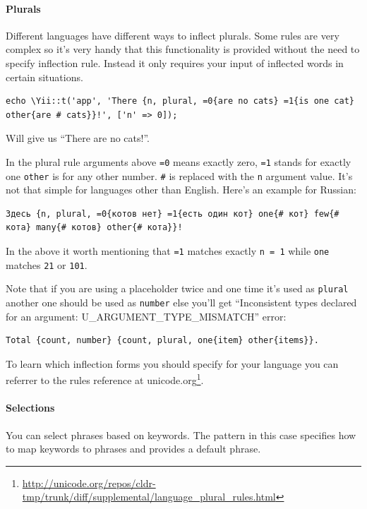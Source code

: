 \paragraph{Plurals}
Different languages have different ways to inflect plurals. Some rules are very complex so it's very handy that this
functionality is provided without the need to specify inflection rule. Instead it only requires your input of inflected
words in certain situations.

\lstset{language=php}\begin{lstlisting}
echo \Yii::t('app', 'There {n, plural, =0{are no cats} =1{is one cat} other{are # cats}}!', ['n' => 0]);
\end{lstlisting}
Will give us ``There are no cats!''.

In the plural rule arguments above \lstinline|=0| means exactly zero, \lstinline|=1| stands for exactly one \lstinline|other| is for any other number.
\lstinline|#| is replaced with the \lstinline|n| argument value. It's not that simple for languages other than English. Here's an example
for Russian:

\begin{lstlisting}
Здесь {n, plural, =0{котов нет} =1{есть один кот} one{# кот} few{# кота} many{# котов} other{# кота}}!
\end{lstlisting}
In the above it worth mentioning that \lstinline|=1| matches exactly \lstinline|n = 1| while \lstinline|one| matches \lstinline|21| or \lstinline|101|.

Note that if you are using a placeholder twice and one time it's used as \lstinline|plural| another one should be used as \lstinline|number| else
you'll get ``Inconsistent types declared for an argument: U\_ARGUMENT\_TYPE\_MISMATCH'' error:

\begin{lstlisting}
Total {count, number} {count, plural, one{item} other{items}}.
\end{lstlisting}
To learn which inflection forms you should specify for your language you can referrer to the
rules reference at unicode.org\footnote{\url{http://unicode.org/repos/cldr-tmp/trunk/diff/supplemental/language\_plural\_rules.html}}.

\paragraph{Selections}
You can select phrases based on keywords. The pattern in this case specifies how to map keywords to phrases and
provides a default phrase.

